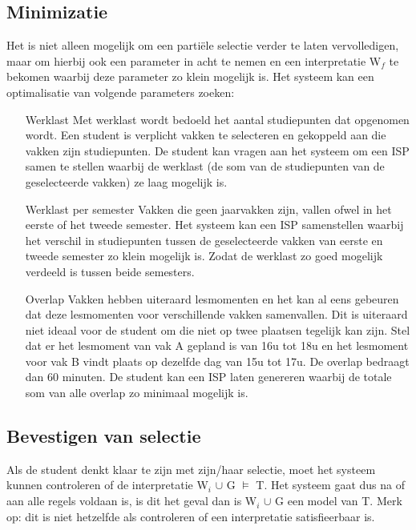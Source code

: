 \subsection{Minimizatie}
Het is niet alleen mogelijk om een parti\"{e}le selectie verder te laten vervolledigen, maar om hierbij ook een parameter in acht te nemen en een interpretatie W$_{f}$ te bekomen waarbij deze parameter zo klein mogelijk is. Het systeem kan een optimalisatie van volgende parameters zoeken:
\begin{itemize}
\item[Werklast] Met werklast wordt bedoeld het aantal studiepunten dat opgenomen wordt. Een student is verplicht vakken te selecteren en gekoppeld aan die vakken zijn studiepunten. De student kan vragen aan het systeem om een ISP samen te stellen waarbij de werklast (de som van de studiepunten van de geselecteerde vakken) ze laag mogelijk is.
\item[Werklast per semester] Vakken die geen jaarvakken zijn, vallen ofwel in het eerste of het tweede semester. Het systeem kan een ISP samenstellen waarbij het verschil in studiepunten tussen de geselecteerde vakken van eerste en tweede semester zo klein mogelijk is. Zodat de werklast zo goed mogelijk verdeeld is tussen beide semesters.
\item[Overlap] Vakken hebben uiteraard lesmomenten en het kan al eens gebeuren dat deze lesmomenten voor verschillende vakken samenvallen. Dit is uiteraard niet ideaal voor de student om die niet op twee plaatsen tegelijk kan zijn. Stel dat er het lesmoment van vak A gepland is van 16u tot 18u en het lesmoment voor vak B vindt plaats op dezelfde dag van 15u tot 17u. De overlap bedraagt dan 60 minuten. De student kan een ISP laten genereren waarbij de totale som van alle overlap zo minimaal mogelijk is. 
\end{itemize}

\subsection{Bevestigen van selectie}
Als de student denkt klaar te zijn met zijn/haar selectie, moet het systeem kunnen controleren of de interpretatie W$_{i}$ $\cup$ G $\models$ T. Het systeem gaat dus na of aan alle regels voldaan is, is dit het geval dan is W$_{i}$ $\cup$ G een model van T. Merk op: dit is niet hetzelfde als controleren of een interpretatie satisfieerbaar is. 

